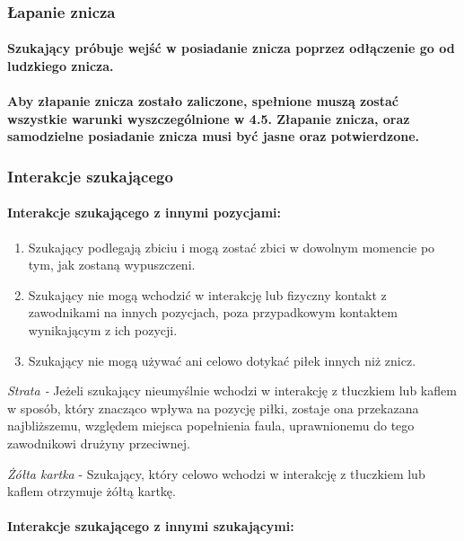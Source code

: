 \documentclass[12pt]{article}
\begin{document}
\subsubsection{Łapanie znicza}

\paragraph{Szukający próbuje wejść w posiadanie znicza poprzez
	odłączenie go od ludzkiego znicza.}

\paragraph{Aby złapanie znicza zostało zaliczone, spełnione muszą
	zostać wszystkie warunki wyszczególnione w 4.5. Złapanie znicza, oraz
	samodzielne posiadanie znicza musi być jasne oraz potwierdzone.}

\subsubsection{Interakcje szukającego}

\paragraph{Interakcje szukającego z innymi pozycjami: }

\begin{enumerate}
	\item
	      Szukający podlegają zbiciu i mogą zostać zbici w dowolnym momencie po
	      tym, jak zostaną wypuszczeni.
	\item
	      Szukający nie mogą wchodzić w interakcję lub fizyczny kontakt z
	      zawodnikami na innych pozycjach, poza przypadkowym kontaktem
	      wynikającym z ich pozycji.
	\item
	      Szukający nie mogą używać ani celowo dotykać piłek innych niż znicz.
\end{enumerate}

\emph{Strata -} Jeżeli szukający nieumyślnie wchodzi w interakcję z
tłuczkiem lub kaflem w sposób, który znacząco wpływa na pozycję piłki,
zostaje ona przekazana najbliższemu, względem miejsca popełnienia faula,
uprawnionemu do tego zawodnikowi drużyny przeciwnej.

\emph{Żółta kartka} - Szukający, który celowo wchodzi w interakcję z
tłuczkiem lub kaflem otrzymuje żółtą kartkę.

\paragraph{Interakcje szukającego z innymi szukającymi:}
\end{document}
